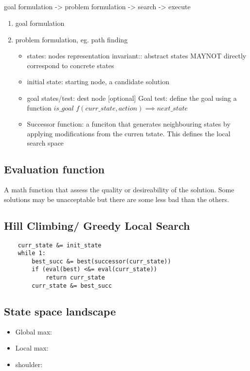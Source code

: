\documentclass{article}
\begin{document}
\subsection{}
goal formulation -> problem formulation -> search -> execute \newline
\begin{enumerate}
    \item goal formulation
    \item problem formulation, eg. path finding 
        \begin{itemize}
            \item states: nodes representation invariant:: abstract states MAYNOT directly correspond to concrete states
            \item initial state: starting node, a candidate solution
            \item goal states/test: dest node [optional]\newline
                Goal test: define the goal using a function $is\_goal $
                $f(curr\_state, action) \implies next\_state $
            \item Successor function: a funciton that generates neighbouring states by applying modifications from the curren tstate. This defines the local search space 
            
        \end{itemize}
\end{enumerate}
\subsection{Evaluation function}
A math function that assess the quality or desireability of the solution. \newline
Some solutions may be unacceptable but there are some less bad than the others. 
\subsection{Hill Climbing/ Greedy Local Search}
\begin{lstlisting}
    curr_state &= init_state
    while 1:
        best_succ &= best(successor(curr_state))
        if (eval(best) <&= eval(curr_state))
            return curr_state
        curr_state &= best_succ
\end{lstlisting}

\subsection{State space landscape}
\begin{itemize}
    \item Global max: 
    \item Local max:
    \item shoulder: 
\end{itemize}
\end{document}
